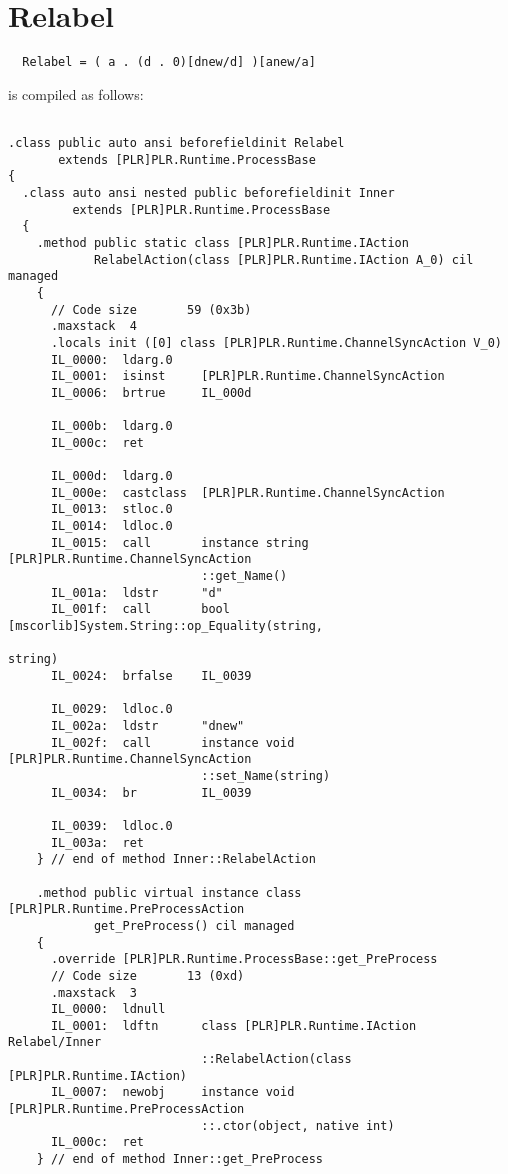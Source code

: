 \section{Relabel}

	\begin{verbatim}
  Relabel = ( a . (d . 0)[dnew/d] )[anew/a]
	\end{verbatim}
	
	is compiled as follows:

\begin{lstlisting}

.class public auto ansi beforefieldinit Relabel
       extends [PLR]PLR.Runtime.ProcessBase
{
  .class auto ansi nested public beforefieldinit Inner
         extends [PLR]PLR.Runtime.ProcessBase
  {
    .method public static class [PLR]PLR.Runtime.IAction 
            RelabelAction(class [PLR]PLR.Runtime.IAction A_0) cil managed
    {
      // Code size       59 (0x3b)
      .maxstack  4
      .locals init ([0] class [PLR]PLR.Runtime.ChannelSyncAction V_0)
      IL_0000:  ldarg.0
      IL_0001:  isinst     [PLR]PLR.Runtime.ChannelSyncAction
      IL_0006:  brtrue     IL_000d

      IL_000b:  ldarg.0
      IL_000c:  ret

      IL_000d:  ldarg.0
      IL_000e:  castclass  [PLR]PLR.Runtime.ChannelSyncAction
      IL_0013:  stloc.0
      IL_0014:  ldloc.0
      IL_0015:  call       instance string [PLR]PLR.Runtime.ChannelSyncAction
                           ::get_Name()
      IL_001a:  ldstr      "d"
      IL_001f:  call       bool [mscorlib]System.String::op_Equality(string,
                                                                     string)
      IL_0024:  brfalse    IL_0039

      IL_0029:  ldloc.0
      IL_002a:  ldstr      "dnew"
      IL_002f:  call       instance void [PLR]PLR.Runtime.ChannelSyncAction
                           ::set_Name(string)
      IL_0034:  br         IL_0039

      IL_0039:  ldloc.0
      IL_003a:  ret
    } // end of method Inner::RelabelAction

    .method public virtual instance class [PLR]PLR.Runtime.PreProcessAction 
            get_PreProcess() cil managed
    {
      .override [PLR]PLR.Runtime.ProcessBase::get_PreProcess
      // Code size       13 (0xd)
      .maxstack  3
      IL_0000:  ldnull
      IL_0001:  ldftn      class [PLR]PLR.Runtime.IAction Relabel/Inner
                           ::RelabelAction(class [PLR]PLR.Runtime.IAction)
      IL_0007:  newobj     instance void [PLR]PLR.Runtime.PreProcessAction
                           ::.ctor(object, native int)
      IL_000c:  ret
    } // end of method Inner::get_PreProcess


\end{lstlisting}
